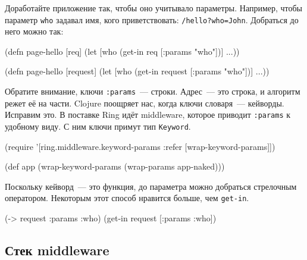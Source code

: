 Доработайте приложение так, чтобы оно учитывало параметры. Например, чтобы
параметр \verb|who| задавал имя, кого приветствовать:
\verb|/hello?who=John|. Добраться до него можно так:

\ifx\DEVICETYPE\MOBILE

\begin{english}
  \begin{clojure}
(defn page-hello [req]
  (let [who (get-in req [:params "who"])]
    ...))
  \end{clojure}
\end{english}

\else

\begin{english}
  \begin{clojure}
(defn page-hello [request]
  (let [who (get-in request [:params "who"])]
    ...))
  \end{clojure}
\end{english}

\fi


Обратите внимание, ключи \verb|:params|~--- строки. Адрес~--- это строка, и
алгоритм режет её на части. Clojure поощряет нас, когда ключи словаря~---
кейворды. Исправим это. В поставке Ring идёт middleware, которое приводит
\verb|:params| к удобному виду. С ним ключи примут тип \verb|Keyword|.


\begin{english}
  \begin{clojure}
(require '[ring.middleware.keyword-params
           :refer [wrap-keyword-params]])

(def app (wrap-keyword-params
           (wrap-params app-naked)))
  \end{clojure}
\end{english}


Поскольку кейворд~--- это функция, до параметра можно добраться стрелочным
оператором. Некоторым этот способ нравится больше, чем \verb|get-in|.

\begin{english}
  \begin{clojure}
(-> request :params :who)
(get-in request [:params :who])
  \end{clojure}
\end{english}

\subsection{Стек middleware}

